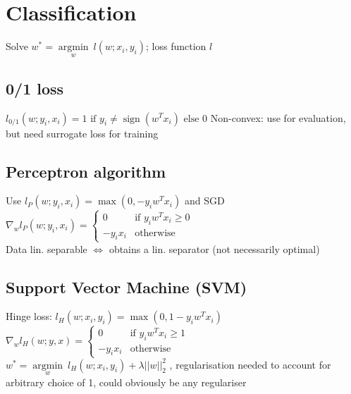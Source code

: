 \section*{Classification}
\noindent Solve $w^* = \underset{w}{\operatorname{argmin}} ~ l(w;x_i,y_i)$; loss function $l$

\subsection*{0/1 loss}
\noindent $l_{0/1} (w;y_i,x_i) = 1 \text{ if } y_i \neq \operatorname{sign}(w^Tx_i) \text{ else } 0$
Non-convex: use for evaluation, but need surrogate loss for training

\subsection*{Perceptron algorithm}
\noindent Use $l_P (w;y_i,x_i) = \operatorname{max}(0, -y_i w^T x_i)$ and SGD\\
$\nabla_w l_P(w;y_i,x_i) = 
\begin{cases}
    0 &\text{if } y_i w^T x_i \geq 0\\
    -y_i x_i &\text{otherwise}
\end{cases}$ \\
Data lin. separable $\Leftrightarrow$ obtains a lin. separator (not necessarily optimal)

\subsection*{Support Vector Machine (SVM)}
\noindent Hinge loss: $l_H(w;x_i,y_i) = \operatorname{max}(0,1-y_i w^T x_i)$ \\
$\nabla_w l_H(w;y,x) = 
\begin{cases}
    0 &\text{if } y_i w^T x_i \geq 1\\
    -y_i x_i &\text{otherwise}
\end{cases}$\\
$w^* = \underset{w}{\operatorname{argmin}} ~ l_H(w;x_i,y_i) + \lambda||w||_2^2$
, regularisation needed to account for arbitrary choice of 1, 
could obviously be any regulariser